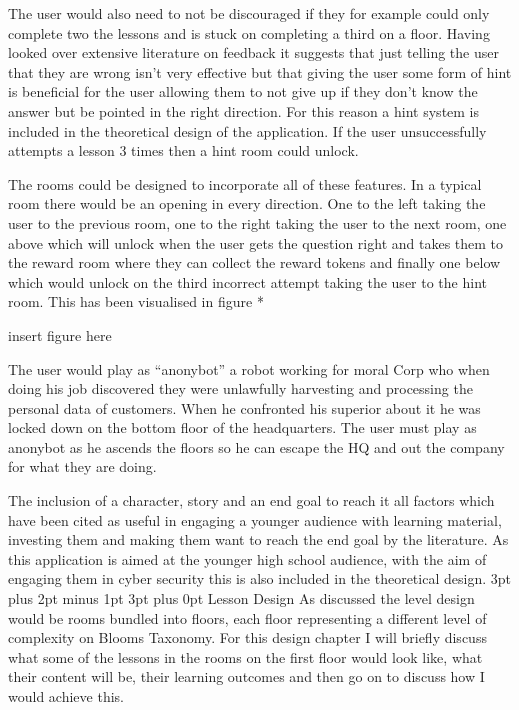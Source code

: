 \documentclass[12pt,a4paper]{article}
\makeatletter
\renewcommand\subsection{\@startsection {subsection}{1}{2mm} %
                               {3pt plus 2pt minus 1pt} %
                               {3pt plus 0pt} %
                               {\normalfont\bfseries}}
\makeatother
\begin{document}

The user would also need to not be discouraged if they for example could only complete two the lessons and is stuck on completing a third on a floor. Having looked over extensive literature on feedback it suggests that just telling the user that they are wrong isn’t very effective but that giving the user some form of hint is beneficial for the user allowing them to not give up if they don’t know the answer but be pointed in the right direction. For this reason a hint system is included in the theoretical design of the application.  If the user unsuccessfully attempts a lesson 3 times then a hint room could unlock. 

The rooms could be designed to incorporate all of these features. In a typical room there would be an opening in every direction. One to the left taking the user to the previous room, one to the right taking the user to the next room, one above which will unlock when the user gets the question right and takes them to the reward room where they can collect the reward tokens and finally one below which would unlock on the third incorrect attempt taking the user to the hint room. This has been visualised in figure * 

insert figure here  

The user would play as “anonybot” a robot working for moral Corp who when doing his job discovered they were unlawfully harvesting and processing the personal data of customers. When he confronted his superior about it he was locked down on the bottom floor of the headquarters. The user must play as anonybot as he ascends the floors so he can escape the HQ and out the company for what they are doing.  

The inclusion of a character, story and an end goal to reach it all factors which have been cited as useful in engaging a younger audience with learning material, investing them and making them want to reach the end goal by the literature. As this application is aimed at the younger high school audience, with the aim of engaging them in cyber security this is also included in the theoretical design.
\subsection{Lesson Design}  
As discussed the level design would be rooms bundled into floors, each floor representing a different level of complexity on Blooms Taxonomy. For this design chapter I will briefly discuss what some of the lessons in the rooms on the first floor would look like, what their content will be, their learning outcomes and then go on to discuss how I would achieve this. 
\end{document}
